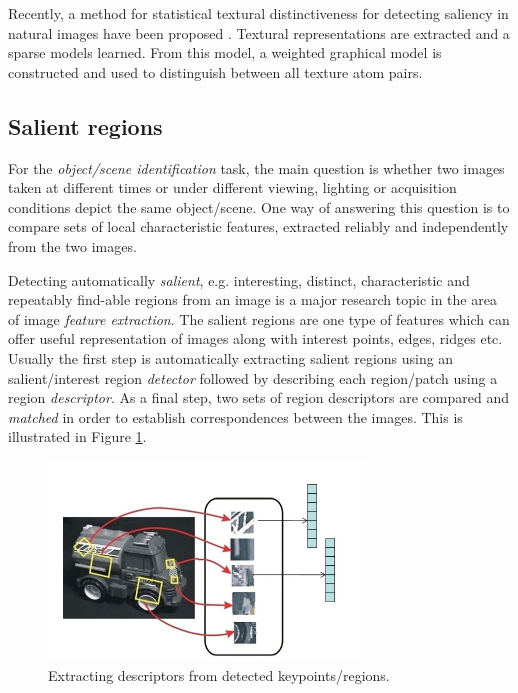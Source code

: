 Recently, a method for statistical textural distinctiveness for detecting saliency in natural images have been proposed \cite{texstatdist2013}. Textural representations are extracted and a sparse models learned. From this model, a weighted graphical model is constructed and used to distinguish between all texture atom pairs.

\subsection{Salient regions}

For the {\em object/scene identification} task, the main question is whether two images taken at different times or under different viewing, lighting or acquisition conditions depict the same object/scene. One way of answering this question is to compare sets of local characteristic features, extracted reliably and independently from the two images.

Detecting automatically {\em salient}, e.g.  interesting, distinct, characteristic and repeatably find-able regions from an image is a major research topic in the area of image {\em feature extraction}. The salient regions are one type of features which can offer useful representation of images along with interest points, edges, ridges etc. Usually the first step is automatically extracting salient regions using an salient/interest region {\em detector} followed by describing each region/patch using a region {\em descriptor}. As a final step, two sets of region descriptors are compared and {\em matched} in order to establish correspondences between the images. This is illustrated in Figure \ref{fig:keydescr}.

\begin{figure}[H]
\begin{center}
\includegraphics[width=0.75\textwidth]{fig/KeypointsDescriptors}
\end{center}
\caption{Extracting descriptors from detected keypoints/regions.}
\label{fig:keydescr}
\end{figure}

